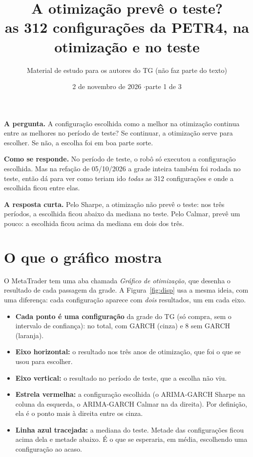 \documentclass[11pt,a4paper]{article}
\title{\textbf{A otimização prevê o teste?}\\[2pt]\large as 312 configurações da PETR4, na otimização e no teste}
\author{Material de estudo para os autores do TG (não faz parte do texto)}
\date{2 de novembro de 2026 \quad$\cdot$\quad parte 1 de 3}
\begin{document}
\maketitle

\begin{ideia}
\textbf{A pergunta.} A configuração escolhida como a melhor na otimização continua entre as melhores no período de
teste? Se continuar, a otimização serve para escolher. Se não, a escolha foi em boa parte sorte.

\textbf{Como se responde.} No período de teste, o robô só executou a configuração escolhida. Mas na refação de
05/10/2026 a grade inteira também foi rodada no teste, então dá para ver como teriam ido \emph{todas} as 312
configurações e onde a escolhida ficou entre elas.

\textbf{A resposta curta.} Pelo Sharpe, a otimização não prevê o teste: nos três períodos, a escolhida ficou
abaixo da mediana no teste. Pelo Calmar, prevê um pouco: a escolhida ficou acima da mediana em dois dos três.
\end{ideia}

\section{O que o gráfico mostra}

O MetaTrader tem uma aba chamada \emph{Gráfico de otimização}, que desenha o resultado de cada passagem da grade.
A Figura~\ref{fig:disp} usa a mesma ideia, com uma diferença: cada configuração aparece com \emph{dois}
resultados, um em cada eixo.

\begin{itemize}\setlength\itemsep{2pt}
  \item \textbf{Cada ponto é uma configuração} da grade do TG (só compra, sem o intervalo de confiança):
        \nA{} no total, \ngarchA{} com GARCH (cinza) e 8 sem GARCH (laranja).
  \item \textbf{Eixo horizontal:} o resultado nos três anos de otimização, que foi o que se usou para escolher.
  \item \textbf{Eixo vertical:} o resultado no período de teste, que a escolha não viu.
  \item \textbf{Estrela vermelha:} a configuração escolhida (o ARIMA-GARCH Sharpe na coluna da esquerda, o
        ARIMA-GARCH Calmar na da direita). Por definição, ela é o ponto mais à direita entre os cinza.
  \item \textbf{Linha azul tracejada:} a mediana do teste. Metade das configurações ficou acima dela e metade
        abaixo. É o que se esperaria, em média, escolhendo uma configuração ao acaso.
\end{itemize}
\end{document}
